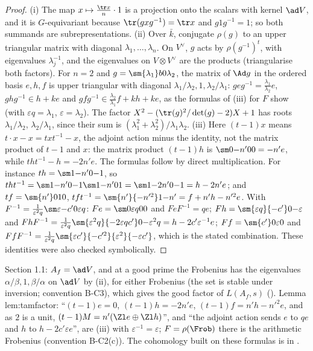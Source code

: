 \begin{proof}
(i) The map $x\mapsto\frac{\tr x}n\cdot1$ is a projection onto the scalars with kernel $\ad V$, and it is $G$-equivariant because
$\tr(gxg^{-1})=\tr x$ and $g1g^{-1}=1$; so both summands are subrepresentations.
(ii) Over $\bar k$, conjugate $\rho(g)$ to an upper triangular matrix with diagonal $\lambda_1,\dots,\lambda_n$. On $V^\vee$, $g$ acts by $\rho(g^{-1})^t$, with eigenvalues
$\lambda_j^{-1}$, and the eigenvalues on $V\otimes V^\vee$ are the products (triangularise both factors). For $n=2$ and $g=\sm{\lambda_1}b0{\lambda_2}$, the matrix of
$\Ad g$ in the ordered basis $e,h,f$ is upper triangular with diagonal $\lambda_1/\lambda_2,1,\lambda_2/\lambda_1$: $geg^{-1}=\frac{\lambda_1}{\lambda_2}e$, $ghg^{-1}\in h+ke$ and
$gfg^{-1}\in\frac{\lambda_2}{\lambda_1}f+kh+ke$, as the formulas of (iii) for $F$ show (with $\varepsilon q=\lambda_1$, $\varepsilon=\lambda_2$). The factor $X^2-(\tr(g)^2/\det(g)-2)X+1$
has roots $\lambda_1/\lambda_2$, $\lambda_2/\lambda_1$, since their sum is $(\lambda_1^2+\lambda_2^2)/\lambda_1\lambda_2$.
(iii) Here $(t-1)x$ means $t\cdot x-x=txt^{-1}-x$, the adjoint action minus the identity, not the matrix product of $t-1$ and $x$: the
matrix product $(t-1)h$ is $\sm0{-n'}00=-n'e$, while $tht^{-1}-h=-2n'e$. The formulas follow by direct multiplication. For instance $th=\sm1{-n'}0{-1}$, so $tht^{-1}=\sm1{-n'}0{-1}\sm1{-n'}01=\sm1{-2n'}0{-1}=h-2n'e$; and
$tf=\sm{n'}010$, $tft^{-1}=\sm{n'}{-n'^2}1{-n'}=f+n'h-n'^2e$. With $F^{-1}=\frac1{\varepsilon^2q}\sm\varepsilon{-c'}0{\varepsilon q}$: $Fe=\sm0{\varepsilon q}00$ and $FeF^{-1}=qe$;
$Fh=\sm{\varepsilon q}{-c'}0{-\varepsilon}$ and $FhF^{-1}=\frac1{\varepsilon^2q}\sm{\varepsilon^2q}{-2\varepsilon qc'}0{-\varepsilon^2q}=h-2c'\varepsilon^{-1}e$; $Ff=\sm{c'}0\varepsilon0$ and
$FfF^{-1}=\frac1{\varepsilon^2q}\sm{\varepsilon c'}{-c'^2}{\varepsilon^2}{-\varepsilon c'}$, which is the stated combination. These identities were also checked symbolically.
\end{proof}

\begin{paperlink}
Section 1.1: $A_f=\ad V$, and at a good prime the Frobenius has the eigenvalues $\alpha/\beta,1,\beta/\alpha$ on $\ad V$ by (ii), for either Frobenius
(the set is stable under inversion; convention B-C3), which gives the good factor of $L(A_f,s)$ (). Lemma lem:tamfactor:
``$(t-1)e=0$, $(t-1)h=-2n'e$, $(t-1)f=n'h-n'^2e$, and as $2$ is a unit, $(t-1)M=n'(\Zl e\oplus\Zl h)$'', and ``the adjoint action sends $e$ to $qe$
and $h$ to $h-2c'\varepsilon e$'', are (iii) with $\varepsilon^{-1}=\varepsilon$; $F=\rho(\Frob)$ there is the arithmetic Frobenius (convention B-C2(c)). The
cohomology built on these formulas is in .
\end{paperlink}

